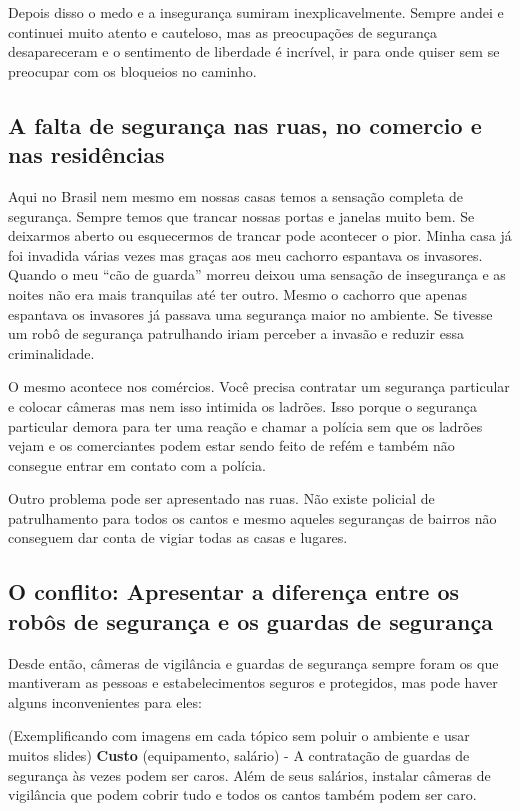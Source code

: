 \documentclass[12pt,a4paper]{article}
\begin{document}
    Depois disso o medo e a insegurança sumiram inexplicavelmente. Sempre andei e continuei muito atento e cauteloso, mas as preocupações de segurança desapareceram e o sentimento de liberdade é incrível, ir para onde quiser sem se preocupar com os bloqueios no caminho.

    \subsection{A falta de segurança nas ruas, no comercio e nas residências}
    Aqui no Brasil nem mesmo em nossas casas temos a sensação completa de segurança. Sempre temos que trancar nossas portas e janelas muito bem. Se deixarmos aberto ou esquecermos de trancar pode acontecer o pior. Minha casa já foi invadida várias vezes mas graças aos meu cachorro espantava os invasores. Quando o meu “cão de guarda” morreu deixou uma sensação de insegurança e as noites não era mais tranquilas até ter outro. Mesmo o cachorro que apenas espantava os invasores já passava uma segurança maior no ambiente. Se tivesse um robô de segurança patrulhando iriam perceber a invasão e reduzir essa criminalidade. 

    O mesmo acontece nos comércios. Você precisa contratar um segurança particular e colocar câmeras mas nem isso intimida os ladrões. Isso porque o segurança particular demora para ter uma reação e chamar a polícia sem que os ladrões vejam e os comerciantes podem estar sendo feito de refém e também não consegue entrar em contato com a polícia.

    Outro problema pode ser apresentado nas ruas. Não existe policial de patrulhamento para todos os cantos e mesmo aqueles seguranças de bairros não conseguem dar conta de vigiar todas as casas e lugares. 

    \subsection{O conflito: Apresentar a diferença entre os robôs de segurança e os guardas de segurança}
    Desde então, câmeras de vigilância e guardas de segurança sempre foram os que mantiveram as pessoas e estabelecimentos seguros e protegidos, mas pode haver alguns inconvenientes para eles: 

    (Exemplificando com imagens em cada tópico sem poluir o ambiente e usar muitos slides)
    \textbf{Custo} (equipamento, salário) - A contratação de guardas de segurança às vezes podem ser caros. Além de seus salários, instalar câmeras de vigilância que podem cobrir tudo e todos os cantos também podem ser caro.
\end{document}
